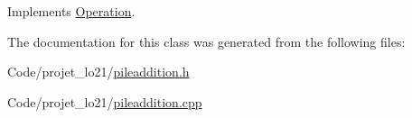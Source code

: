 Implements \hyperlink{class_operation_a626eccac15444a5f5eda8300ab381d88}{Operation}.



The documentation for this class was generated from the following files\-:\begin{DoxyCompactItemize}
\item 
Code/projet\-\_\-lo21/\hyperlink{pileaddition_8h}{pileaddition.\-h}\item 
Code/projet\-\_\-lo21/\hyperlink{pileaddition_8cpp}{pileaddition.\-cpp}\end{DoxyCompactItemize}
